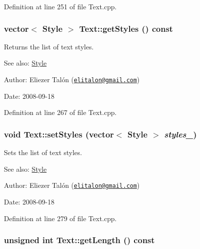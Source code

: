 Definition at line 251 of file Text.cpp.\hypertarget{class_text_5d0279f5ce832a447c68b99182753928}{
\subsubsection[getStyles]{\setlength{\rightskip}{0pt plus 5cm}vector$<$ {\bf Style} $>$ Text::getStyles () const}}
\label{class_text_5d0279f5ce832a447c68b99182753928}


Returns the list of text styles. 

\begin{Desc}
\item[See also:]\hyperlink{class_style}{Style}\end{Desc}
\begin{Desc}
\item[Author:]Eliezer Talón (\href{mailto:elitalon@gmail.com}{\tt elitalon@gmail.com}) \end{Desc}
\begin{Desc}
\item[Date:]2008-09-18 \end{Desc}


Definition at line 267 of file Text.cpp.\hypertarget{class_text_84a3f53c167e11c2ef455fa8a26bb15f}{
\subsubsection[setStyles]{\setlength{\rightskip}{0pt plus 5cm}void Text::setStyles (vector$<$ {\bf Style} $>$ {\em styles\_\-})}}
\label{class_text_84a3f53c167e11c2ef455fa8a26bb15f}


Sets the list of text styles. 

\begin{Desc}
\item[See also:]\hyperlink{class_style}{Style}\end{Desc}
\begin{Desc}
\item[Author:]Eliezer Talón (\href{mailto:elitalon@gmail.com}{\tt elitalon@gmail.com}) \end{Desc}
\begin{Desc}
\item[Date:]2008-09-18 \end{Desc}


Definition at line 279 of file Text.cpp.\hypertarget{class_text_ea91ea415ed40d6cd0aff9063d72756e}{
\subsubsection[getLength]{\setlength{\rightskip}{0pt plus 5cm}unsigned int Text::getLength () const}}
\label{class_text_ea91ea415ed40d6cd0aff9063d72756e}


